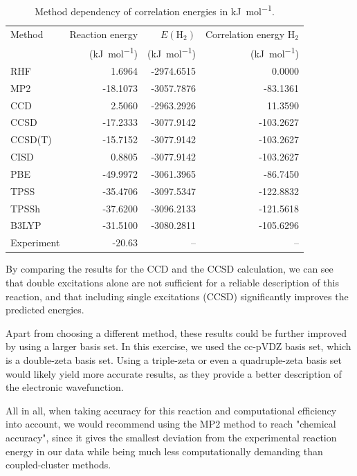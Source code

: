\documentclass[a4paper,12pt]{scrartcl}
\begin{document}
\begin{table}[H]
\centering
\caption{Method dependency of correlation energies in \si{\kilo\joule\per\mole}.}
\label{tab:reaction_energies}
\begin{tabular}{lrrr}
\toprule
Method & Reaction energy & $E(\mathrm{H_2})$ & Correlation energy $\mathrm{H_2}$ \\
& (\si{\kilo\joule\per\mole}) & (\si{\kilo\joule\per\mole}) & (\si{\kilo\joule\per\mole}) \\
\midrule
RHF     & 1.6964   & -2974.6515 & 0.0000 \\
MP2     & -18.1073 & -3057.7876 & -83.1361 \\
CCD     & 2.5060   & -2963.2926 & 11.3590 \\
CCSD    & -17.2333 & -3077.9142 & -103.2627 \\
CCSD(T) & -15.7152 & -3077.9142 & -103.2627 \\
CISD    & 0.8805   & -3077.9142 & -103.2627 \\
PBE     & -49.9972 & -3061.3965 & -86.7450 \\
TPSS    & -35.4706 & -3097.5347 & -122.8832 \\
TPSSh   & -37.6200 & -3096.2133 & -121.5618 \\
B3LYP   & -31.5100 & -3080.2811 & -105.6296 \\
Experiment & -20.63 & -- & -- \\
\bottomrule
\end{tabular}
\end{table}

By comparing the results for the CCD and the CCSD calculation, we can see that double excitations alone are not sufficient for a reliable description of this reaction, and that including single excitations (CCSD) significantly improves the predicted energies.

Apart from choosing a different method, these results could be further improved by using a larger basis set. In this exercise, we used the cc-pVDZ basis set, which is a double-zeta basis set. Using a triple-zeta or even a quadruple-zeta basis set would likely yield more accurate results, as they provide a better description of the electronic wavefunction.

All in all, when taking accuracy for this reaction and computational efficiency into account, we would recommend using the MP2 method to reach "chemical accuracy", since it gives the smallest deviation from the experimental reaction energy in our data while being much less computationally demanding than coupled-cluster methods.
\end{document}
